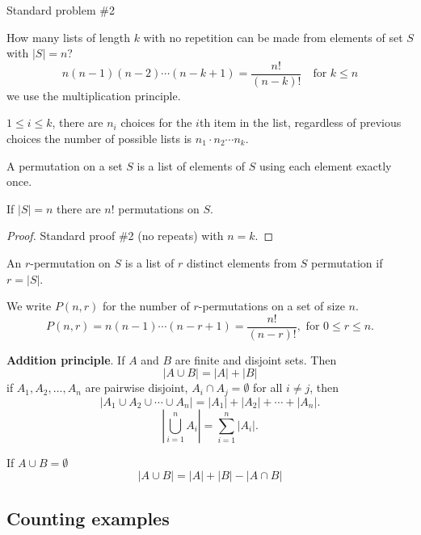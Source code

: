 \documentclass[10pt, a4paper]{article}
\begin{document}
Standard problem \#2

How many lists of length $k$ with no repetition can be made from elements of set $S$ with $|S| = n$?
\[
n(n - 1)(n - 2) \dotsi (n - k + 1) = \frac{n!}{(n - k)!}\quad\text{for } k \leq n
\]
we use the multiplication principle.

$1 \leq i \leq k$, there are $n_i$ choices for the $i$th item in the list, regardless of previous choices the number of possible lists is $n_1  \cdot n_2 \dotsi n_k$.

\begin{definition}
    A permutation on a set $S$ is a list of elements of $S$ using each element exactly once.
\end{definition}

\begin{proposition}
    If $|S| = n$ there are $n!$ permutations on $S$.

    \begin{proof}
        Standard proof \#2 (no repeats) with $n = k$.
    \end{proof}
\end{proposition}

An $r$-permutation on $S$ is a list of $r$ distinct elements from $S$ permutation if $r = |S|$.

We write $P(n, r)$ for the number of $r$-permutations on a set of size $n$.
\[
P(n, r) = n(n - 1) \dotsi (n - r + 1) = \frac{n!}{(n - r)!},\text{ for } 0 \leq r \leq n.
\]

\textbf{Addition principle}. If $A$ and $B$ are finite and disjoint sets. Then
\[
|A \cup B| = |A| + |B|
\]
if $A_1, A_2, \dotsc, A_n$ are pairwise disjoint, $A_i \cap A_j = \emptyset$ for all $i \neq j$, then
\[
|A_1 \cup A_2 \cup \dotsi \cup A_n| = |A_1| + |A_2| + \dotsi + |A_n|.
\]
\[
\left|\bigcup_{i = 1}^{n}A_i\right| = \sum_{i = 1}^{n}|A_i|.
\]

If $A \cup B = \emptyset$
\[
|A \cup B| = |A| + |B| - |A \cap B|
\]

\subsection{Counting examples}
\end{document}
